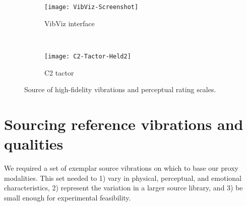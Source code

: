 \begin{figure}[tb]
\begin{subfigure}{0.28\textwidth}
        		\centering
	    	 \texttt{[image: VibViz-Screenshot]}
            \caption{VibViz interface ~\cite{Seifi2015}}
            \label{fig:vibviz}
         \end{subfigure}~
	\begin{subfigure}{0.19\textwidth}
    	\centering
     	 \texttt{[image: C2-Tactor-Held2]}
            \caption{C2 tactor}
            \label{fig:c2tactor}
         \end{subfigure}
            \label{fig:approach}
            \caption{Source of high-fidelity vibrations and perceptual rating scales.}
\end{figure}

\vspace{0.25in}
\section{Sourcing reference vibrations and qualities}%


We required a set of exemplar source vibrations on which to base our proxy modalities. 
This set needed to
1) vary in physical, perceptual, and %
emotional characteristics,
2) represent the variation in a larger source library, and
3) be small enough for experimental feasibility.



